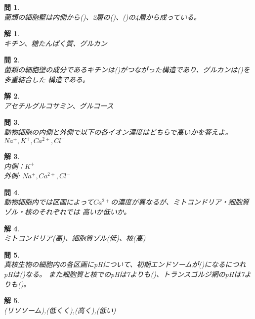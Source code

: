 \documentclass{jsarticle}
\newtheorem{pro}{問}[section]
\newtheorem{ans}{解}[section]
\begin{document}
\begin{pro}~\\
    菌類の細胞壁は内側から(\hspace{5mm})、2層の(\hspace{5mm})、(\hspace{5mm})の4層から成っている。
\end{pro}
\begin{ans}~\\
    キチン、糖たんぱく質、グルカン
\end{ans}

\begin{pro}~\\
    菌類の細胞壁の成分であるキチンは(\hspace{5mm})がつながった構造であり、グルカンは(\hspace{5mm})を多重結合した
    構造である。
\end{pro}
\begin{ans}~\\
    アセチルグルコサミン、グルコース
\end{ans}

\begin{pro}~\\
    動物細胞の内側と外側で以下の各イオン濃度はどちらで高いかを答えよ。\\
    \(Na^{+},K^{+},Ca^{2+},Cl^{-}\)
\end{pro}
\begin{ans}~\\
    内側：\(K^{+}\)\\
    外側: \(Na^{+},Ca^{2+},Cl^{-}\)
\end{ans}

\begin{pro}~\\
    動物細胞内では区画によって\(Ca^{2+}\)の濃度が異なるが、ミトコンドリア・細胞質ゾル・核のそれぞれでは
    高いか低いか。
\end{pro}
\begin{ans}~\\
    ミトコンドリア(高)、細胞質ゾル(低)、核(高)
\end{ans}

\begin{pro}~\\
    真核生物の細胞内の各区画にpHについて、初期エンドソームが(\hspace{5mm})になるにつれpHは(\hspace{5mm})なる。
    また細胞質と核でのpHは7よりも(\hspace{5mm})、トランスゴルジ網のpHは7よりも(\hspace{5mm})。
\end{pro}
\begin{ans}~\\
    (リソソーム),(低くく),(高く),(低い)
\end{ans}
\end{document}
